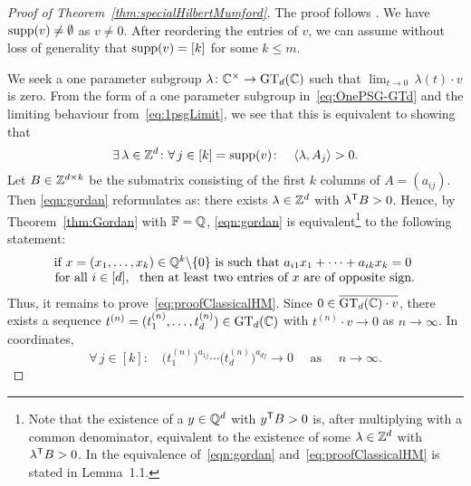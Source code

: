 \begin{proof}[Proof of Theorem~\ref{thm:specialHilbertMumford}]
	The proof follows \cite{Sury}. We have $\operatorname{supp}(v) \neq \emptyset$ as $v \neq 0$. After reordering the entries of $v$, we can assume without loss of generality that $\operatorname{supp}(v) = [k]$ for some $k \leq m$.
	
	We seek a one parameter subgroup $\lambda \colon \mathbb C^\times \to \operatorname{GT}_d(\mathbb C)$ such that $\lim_{t \to 0} \, \lambda(t) \cdot v$ is zero. 
	From the form of a one parameter subgroup in~\eqref{eq:OnePSG-GTd} and the limiting behaviour from~\eqref{eq:1psgLimit}, we see that this is equivalent to showing that
	\begin{equation}
		\label{eqn:gordan}
		\exists \, \lambda \in \mathbb Z^d \colon \forall\, j \in [k] = \operatorname{supp}(v) \colon \quad  \langle \lambda, A_j \rangle > 0 .
	\end{equation}
	Let $B \in \mathbb Z^{d \times k}$ be the submatrix consisting of the first $k$ columns of $A = (a_{ij})$. Then \eqref{eqn:gordan} reformulates as: there exists $\lambda \in \mathbb Z^d$ with $\lambda^{\mathsf{T}} B > 0$. Hence, by Theorem~\ref{thm:Gordan} with $\mathbb F = \mathbb Q$, \eqref{eqn:gordan} is equivalent\footnote{Note that the existence of a $y \in \mathbb Q^d$ with $y^{\mathsf{T}} B > 0$ is, after multiplying with a common denominator, equivalent to the existence of some $\lambda \in \mathbb Z^d$ with $\lambda^{\mathsf{T}} B >0$. In \cite{Sury} the equivalence of~\eqref{eqn:gordan} and~\eqref{eq:proofClassicalHM} is stated in Lemma~1.1.}
	to the following statement:
	\begin{equation}\label{eq:proofClassicalHM}
		\begin{matrix}    \text{if} \, \, x = (x_1,\ldots,x_k) \in \mathbb Q^k \backslash \{0\} \, \, \text{is such that} \, \,
			a_{i1} x_1 + \cdots + a_{ik} x_k = 0 \, \, \\ \text{for all} \, \, i \in [d], \,\,
			\text{ then at least two entries of $x$ are of opposite sign.}
		\end{matrix} 
	\end{equation}
	Thus, it remains to prove~\eqref{eq:proofClassicalHM}.
	Since $0 \in \overline{\operatorname{GT}_d(\mathbb C) \cdot v}$, there exists a sequence $t^{(n)} = (t^{(n)}_1,\ldots,t^{(n)}_d) \in \operatorname{GT}_d(\mathbb C)$ with $t^{(n)} \cdot v \to 0$ as $n \to \infty$. In coordinates, 
	\begin{equation}\label{eq:lambdaN}
		\forall \, j \in [k] \colon \quad  \big( t^{(n)}_1 \big)^{a_{1j}} \cdots \big( t^{(n)}_d \big)^{a_{dj}} \to 0 \quad \text{ as } \quad n \to \infty .
	\end{equation}

\end{proof}
